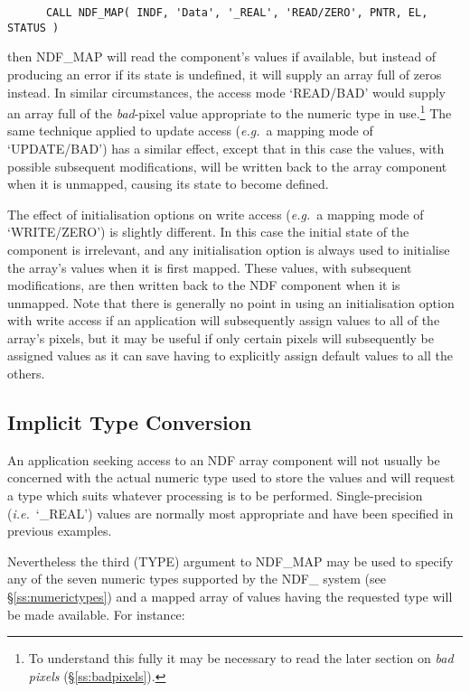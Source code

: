 \documentclass[twoside,11pt]{article}
\newcommand{\htmlref}[2]{#1}
\newcommand{\xlabel}[1]{}
\newcommand{\st}[1]{{\em{#1}}}
\begin{document}
\small
\begin{verbatim}
      CALL NDF_MAP( INDF, 'Data', '_REAL', 'READ/ZERO', PNTR, EL, STATUS )
\end{verbatim}
\normalsize

then NDF\_MAP will read the component's values if available, but instead of
producing an error if its state is undefined, it will supply an array full
of zeros instead. 
In similar circumstances, the access mode `READ/BAD' would supply an array
full of the \st{bad\/}-pixel value appropriate to the numeric type in
use.\footnote{To understand this fully it may be necessary to read the later
section on \st{bad pixels\/} (\S\ref{ss:badpixels}).} 
The same technique applied to update access (\st{e.g.}\ a mapping mode of
`UPDATE/BAD') has a similar effect, except that in this case the values, with
possible subsequent modifications, will be written back to the array component
when it is unmapped, causing its state to become defined. 

The effect of initialisation options on write access (\st{e.g.}\ a mapping
mode of `WRITE/ZERO') is slightly different. 
In this case the initial state of the component is irrelevant, and any
initialisation option is always used to initialise the array's values when
it is first mapped. 
These values, with subsequent modifications, are then written back to the
NDF component when it is unmapped. 
Note that there is generally no point in using an initialisation option with
write access if an application will subsequently assign values to all of
the array's pixels, but it may be useful if only certain pixels will
subsequently be assigned values as it can save having to explicitly assign
default values to all the others. 

\subsection{\xlabel{implicit_type_conversion}\label{ss:implicitconversion}Implicit Type Conversion}

An application seeking access to an NDF array component will not usually be
concerned with the actual numeric type used to store the values and will
request a type which suits whatever processing is to be performed. 
Single-precision (\st{i.e.}\ `\_REAL') values are normally most appropriate and
have  been specified in previous examples.

Nevertheless the third (TYPE) argument to \htmlref{NDF\_MAP}{NDF_MAP} may be used to specify any
of the seven numeric types supported by the NDF\_ system (see
\S\ref{ss:numerictypes}) and a mapped array of values having the requested
type will be made available. 
For instance:
\end{document}
